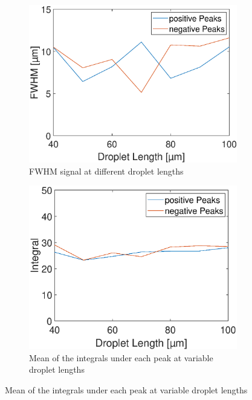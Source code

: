 \begin{figure}[h]
	\begin{subfigure}[l]{0.49\linewidth} 
		\centering
		\includegraphics[clip,trim={0mm 0mm 0mm 0mm}, width=\linewidth]{Ressourcen/Results/L-400/FWHM}
		\caption{FWHM signal at different droplet lengths}
		\label{fig:sim:l:GMR:FWHM}
	\end{subfigure}
	\hfil
	\begin{subfigure}[r]{0.49\linewidth} 
		\centering
		\includegraphics[clip,trim={0mm 0mm 0mm 0mm}, width=\linewidth]{Ressourcen/Results/L-400/Int}
		\caption{Mean of the integrals under each peak at variable droplet lengths}
		\label{fig:sim:l:GMR:int}
	\end{subfigure}

\end{figure}
